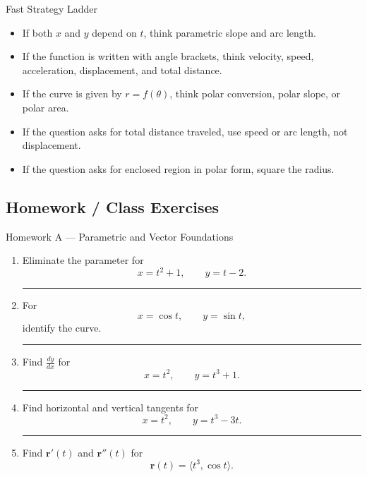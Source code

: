 \documentclass[11pt]{article}
\newcommand{\hwspace}{\vspace{0.8em}\hrule\vspace{0.8em}}
\newcommand{\vect}[1]{\mathbf{#1}}
\begin{document}
\vspace{1em}
\newpage
\begin{summarybox}{Fast Strategy Ladder}
\begin{itemize}
    \item If both \(x\) and \(y\) depend on \(t\), think parametric slope and arc length.
    \item If the function is written with angle brackets, think velocity, speed, acceleration, displacement, and total distance.
    \item If the curve is given by \(r=f(\theta)\), think polar conversion, polar slope, or polar area.
    \item If the question asks for total distance traveled, use speed or arc length, not displacement.
    \item If the question asks for enclosed region in polar form, square the radius.
\end{itemize}
\end{summarybox}

\newpage
\subsection{Homework / Class Exercises}

\begin{homeworkset}{Homework A --- Parametric and Vector Foundations}
\begin{enumerate}
    \item Eliminate the parameter for
    \[
    x=t^2+1,\qquad y=t-2.
    \]
    \hwspace

    \item For
    \[
    x=\cos t,\qquad y=\sin t,
    \]
    identify the curve.
    \hwspace

    \item Find \(\frac{dy}{dx}\) for
    \[
    x=t^2,\qquad y=t^3+1.
    \]
    \hwspace

    \item Find horizontal and vertical tangents for
    \[
    x=t^2,\qquad y=t^3-3t.
    \]
    \hwspace

    \item Find \(\vect{r}'(t)\) and \(\vect{r}''(t)\) for
    \[
    \vect{r}(t)=\langle t^3,\cos t\rangle.
    \]
\end{enumerate}
\end{homeworkset}
\end{document}
